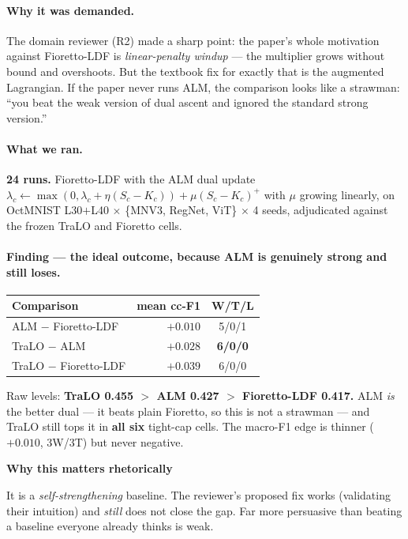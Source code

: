 \documentclass[11pt,a4paper]{article}
\newenvironment{callout}[1]
  {\par\medskip\noindent\begin{lrbox}{\calloutbox}%
   \begin{minipage}{\dimexpr\linewidth-20pt\relax}%
   \textbf{#1}\par\smallskip}
  {\end{minipage}\end{lrbox}%
   \setlength{\fboxsep}{10pt}%
   \colorbox{boxgrey}{\usebox{\calloutbox}}\par\medskip}
\begin{document}
\paragraph{Why it was demanded.} The domain reviewer (R2) made a sharp point: the paper's whole
motivation against Fioretto-LDF is \emph{linear-penalty windup} --- the multiplier grows without
bound and overshoots. But the textbook fix for exactly that is the augmented Lagrangian. If the
paper never runs ALM, the comparison looks like a strawman: ``you beat the weak version of dual
ascent and ignored the standard strong version.''

\paragraph{What we ran.} \textbf{24 runs.} Fioretto-LDF with the ALM dual update
$\lambda_c \leftarrow \max(0, \lambda_c + \eta(S_c - K_c)) + \mu(S_c-K_c)^+$ with $\mu$ growing
linearly, on OctMNIST L30$+$L40 $\times$ \{MNV3, RegNet, ViT\} $\times$ 4 seeds, adjudicated against
the frozen TraLO and Fioretto cells.

\paragraph{Finding --- the ideal outcome, because ALM is genuinely strong and still loses.}

\begin{center}
\begin{tabular}{@{}l r c@{}}
\toprule
\textbf{Comparison} & \textbf{mean cc-F1} & \textbf{W/T/L} \\
\midrule
ALM $-$ Fioretto-LDF   & $\mathbf{+0.010}$ & 5/0/1 \\
TraLO $-$ ALM          & $\mathbf{+0.028}$ & \textbf{6/0/0} \\
TraLO $-$ Fioretto-LDF & $+0.039$          & 6/0/0 \\
\bottomrule
\end{tabular}
\end{center}

Raw levels: \textbf{TraLO 0.455 $>$ ALM 0.427 $>$ Fioretto-LDF 0.417.} ALM \emph{is} the better dual
--- it beats plain Fioretto, so this is not a strawman --- and TraLO still tops it in \textbf{all
six} tight-cap cells. The macro-F1 edge is thinner ($+0.010$, 3W/3T) but never negative.

\begin{callout}{Why this matters rhetorically}
It is a \emph{self-strengthening} baseline. The reviewer's proposed fix works (validating their
intuition) and \emph{still} does not close the gap. Far more persuasive than beating a baseline
everyone already thinks is weak.
\end{callout}
\end{document}
